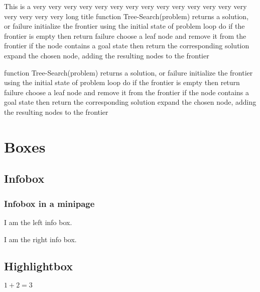 \documentclass[10pt,titlepage]{article}
\begin{document}
\begin{code}[pseudo]{ This is a very very very very very very very very very very very very very very very very very very long title}
  function Tree-Search(problem) returns a solution, or failure
  initialize the frontier using the initial state of problem
  loop do
  if the frontier is empty then return failure
  choose a leaf node and remove it from the frontier
  if the node contains a goal state then return the corresponding solution
  expand the chosen node, adding the resulting nodes to the frontier

  function Tree-Search(problem) returns a solution, or failure
  initialize the frontier using the initial state of problem
  loop do
  if the frontier is empty then return failure
  choose a leaf node and remove it from the frontier
  if the node contains a goal state then return the corresponding solution
  expand the chosen node, adding the resulting nodes to the frontier
\end{code}

\section{Boxes}
\subsection{Infobox}
\begin{infobox}[noprefix=false]
  \lipsum[1-1]
\end{infobox}

\subsubsection{Infobox in a minipage}
\noindent
\begin{minipage}{0.5\linewidth}%
  \begin{flushleft}
    \begin{infobox}[title={This is the title},noprefix,nofloat,width=0.95\linewidth]
      I am the left info box.
    \end{infobox}
  \end{flushleft}
\end{minipage}%
\begin{minipage}{0.5\linewidth}%
  \begin{flushright}
    \begin{infobox}[title={This is the title},noprefix,nofloat,width=0.95\linewidth]
      I am the right info box.
    \end{infobox}
  \end{flushright}
\end{minipage}%

\subsection{Highlightbox}
\begin{highlightbox}
  \(1 + 2 = 3\)
\end{highlightbox}
\end{document}
